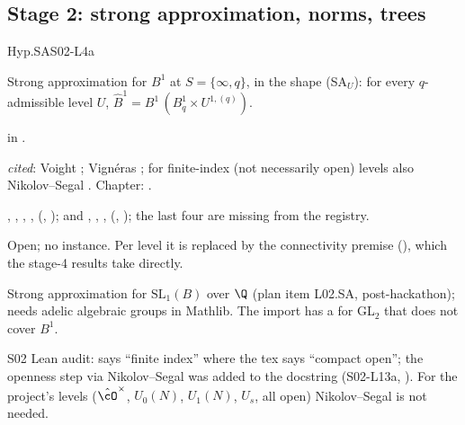 \subsection{Stage 2: strong approximation, norms, trees}

\begin{hypentry}{Hyp.SA}{\kindlit}{S02-L4a}
\item[Statement] Strong approximation for $B^1$ at $S=\{\infty,q\}$, in the shape (SA$_U$): for every $q$-admissible
  level $U$, $\hat B^1=B^1\,(B^1_q\times U^{1,(q)})$.
\item[Lean]  in .
\item[Source] \emph{cited}: Voight \cite[Main Thm.~28.5.3, Cor.~28.5.12]{Vo}; Vign\'eras \cite[III.4.3]{Vigneras1980};
  for finite-index (not necessarily open) levels also Nikolov--Segal \cite[Thm.~1.1]{NS07}. Chapter: .
\item[Used by] , ,
  , , 
  (, ); and ,
  , , 
  (, ); the last four are missing from the registry.
\item[Status] Open; no instance. Per level it is replaced by the connectivity premise 
  (), which the  stage-4 results take directly.
\item[Discharge] Strong approximation for $\mathrm{SL}_1(B)$ over $\Q$ (plan item L02.SA, post-hackathon); needs adelic
  algebraic groups in Mathlib. The import has a  for GL$_2$ that does not cover $B^1$.
\item[History] S02 Lean audit:  says ``finite index'' where the tex says ``compact open'';
  the openness step via Nikolov--Segal was added to the docstring (S02-L13a, ). For the project's levels
  ($\hat\cO^\times$, $U_0(N)$, $U_1(N)$, $U_s$, all open) Nikolov--Segal is not needed.
\end{hypentry}

